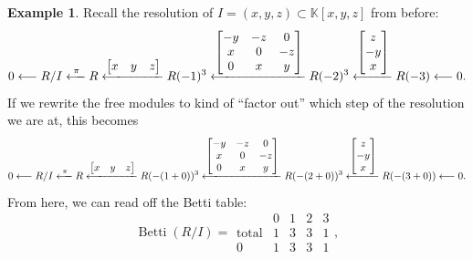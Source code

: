 \documentclass[12pt,a4paper]{article}
\newcommand{\KK}{\mathbb{K}}
\DeclareMathOperator{\Betti}{Betti}
\theoremstyle{definition}
\newtheorem{example}[theorem]{Example}
\numberwithin{equation}{section}
\begin{document}
\begin{example}
    Recall the resolution of $I = (x,y,z) \subset \KK[x,y,z]$ from before:
    \begin{equation*}
        0 \longleftarrow R/I \xlongleftarrow[]{\pi} R \xlongleftarrow[]{\begin{bmatrix} x & y & z \end{bmatrix}} R(-1)^3 \xlongleftarrow[]{\begin{bmatrix} -y & -z & 0 \\ x & 0 & -z \\ 0 & x & y \end{bmatrix}} R(-2)^3 \xlongleftarrow[]{\begin{bmatrix} z \\ -y \\ x \end{bmatrix}} R(-3) \longleftarrow 0.
    \end{equation*}
    If we rewrite the free modules to kind of ``factor out'' which step of the resolution we are at, this becomes
    \begin{equation*}
        0 \longleftarrow R/I \xlongleftarrow[]{\pi} R \xlongleftarrow[]{\begin{bmatrix} x & y & z \end{bmatrix}} R(-(1 + 0))^3 \xlongleftarrow[]{\begin{bmatrix} -y & -z & 0 \\ x & 0 & -z \\ 0 & x & y \end{bmatrix}} R(-(2 + 0))^3 \xlongleftarrow[]{\begin{bmatrix} z \\ -y \\ x \end{bmatrix}} R(-(3 + 0)) \longleftarrow 0.
    \end{equation*}
    From here, we can read off the Betti table:
    \begin{equation*}
        \Betti(R/I) =
        \begin{array}{r|cccc}
          & 0 & 1 & 2 & 3 \\
        \hline
        \text{total} & 1 & 3 & 3 & 1 \\
        \hline
         0 & 1 & 3 & 3 & 1
    \end{array},
    \end{equation*}
\end{example}
\end{document}
